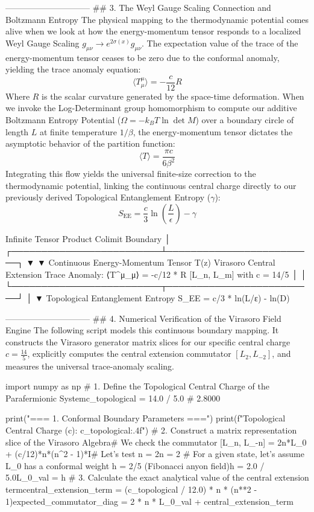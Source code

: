 ------------------------------
## 3. The Weyl Gauge Scaling Connection and Boltzmann Entropy
The physical mapping to the thermodynamic potential comes alive when we look at how the energy-momentum tensor responds to a localized Weyl Gauge Scaling $g_{\mu\nu} \to e^{2\sigma(x)}g_{\mu\nu}$.
The expectation value of the trace of the energy-momentum tensor ceases to be zero due to the conformal anomaly, yielding the trace anomaly equation:
$$\langle T^\mu_\mu \rangle = -\frac{c}{12} R$$ 
Where $R$ is the scalar curvature generated by the space-time deformation.
When we invoke the Log-Determinant group homomorphism to compute our additive Boltzmann Entropy Potential ($\Omega = -k_B T \ln \det M$) over a boundary circle of length $L$ at finite temperature $1/\beta$, the energy-momentum tensor dictates the asymptotic behavior of the partition function:
$$\langle T \rangle = \frac{\pi c}{6 \beta^2}$$ 
Integrating this flow yields the universal finite-size correction to the thermodynamic potential, linking the continuous central charge directly to our previously derived Topological Entanglement Entropy ($\gamma$):
$$S_{\text{EE}} = \frac{c}{3} \ln\left(\frac{L}{\epsilon}\right) - \gamma$$ 

                  Infinite Tensor Product Colimit Boundary
                                     │
           ┌─────────────────────────┴─────────────────────────┐
           ▼                                                   ▼
 Continuous Energy-Momentum Tensor T(z)             Virasoro Central Extension
      Trace Anomaly: ⟨T^μ_μ⟩ = -c/12 * R               [L_n, L_m] with c = 14/5
           │                                                   │
           └─────────────────────────┬─────────────────────────┘
                                     │
                                     ▼
                      Topological Entanglement Entropy
                       S_EE = c/3 * ln(L/ε) - ln(D)

------------------------------
## 4. Numerical Verification of the Virasoro Field Engine
The following script models this continuous boundary mapping. It constructs the Virasoro generator matrix slices for our specific central charge $c = \frac{14}{5}$, explicitly computes the central extension commutator $[L_2, L_{-2}]$, and measures the universal trace-anomaly scaling.

import numpy as np
# 1. Define the Topological Central Charge of the Parafermionic Systemc_topological = 14.0 / 5.0  # 2.8000

print("=== 1. Conformal Boundary Parameters ===")
print(f"Topological Central Charge (c): {c_topological:.4f}")
# 2. Construct a matrix representation slice of the Virasoro Algebra# We check the commutator [L_n, L_-n] = 2n*L_0 + (c/12)*n*(n^2 - 1)*I# Let's test n = 2n = 2
# For a given state, let's assume L_0 has a conformal weight h = 2/5 (Fibonacci anyon field)h = 2.0 / 5.0L_0_val = h
# 3. Calculate the exact analytical value of the central extension termcentral_extension_term = (c_topological / 12.0) * n * (n**2 - 1)expected_commutator_diag = 2 * n * L_0_val + central_extension_term


